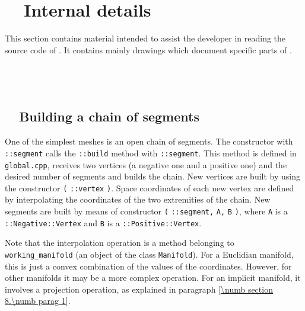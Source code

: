 

\chapter{~~Internal details}\label{\numb section 12}

This section contains material intended to assist the developer in reading the source code
of \maniFEM.
It contains mainly drawings which document specific parts of \maniFEM.


\section{~~\cinza{[empty]}}\label{\numb section 12.\numb parag 1}


\section{~~Building a chain of segments}\label{\numb section 12.\numb parag 2}

One of the simplest meshes is an open chain of segments.
The {\small\tt {}} constructor with {\small\tt {}::segment}
calls the {\small\tt{}::build} method with {\small\tt {}::segment}.
This method is defined in
{\small\tt global.cpp}, receives two vertices (a negative one and a positive one)
and the desired number of segments and builds the chain.
New vertices are built by using the constructor\hfil\break
{\small\tt {}} {\small\tt(} {\small\tt{}::vertex} {\small\tt)}.
Space coordinates of each new vertex are defined by interpolating the coordinates of the
two extremities of the chain.
New segments are built by means of constructor {\small\tt {}} {\small\tt(}
{\small\tt{}::segment,} {\small\tt A,} {\small\tt B} {\small\tt )},
where {\small\tt A} is a {\small\tt {}::Negative::Vertex} and {\small\tt B} is a
{\small\tt {}::Positive::Vertex}.

Note that the interpolation operation is a method belonging to {\small\tt working\_manifold}
(an object of the class {\small\tt Manifold}).
For a Euclidian manifold, this is just a convex combination of the values of the coordinates.
However, for other manifolds it may be a more complex operation.
For an implicit manifold, it involves a projection operation, as explained in paragraph
\ref{\numb section 8.\numb parag 1}.


